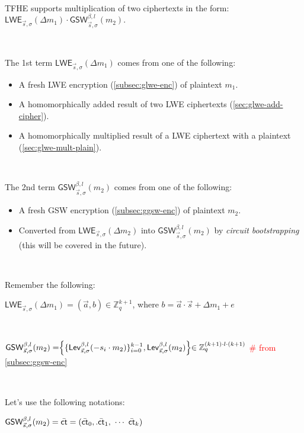 $ $

TFHE supports multiplication of two ciphertexts in the form: $\textsf{LWE}_{\vec{s}, \sigma}(\Delta m_1) \cdot \textsf{GSW}_{\vec{s}, \sigma}^{\beta, l}(m_2)$. 

$ $

\noindent The 1st term $\textsf{LWE}_{\vec{s}, \sigma}(\Delta m_1)$ comes from one of the following: 
\begin{itemize}
\item A fresh LWE encryption (\autoref{subsec:glwe-enc}) of plaintext $m_1$. 
\item A homomorphically added result of two LWE ciphertexts (\autoref{sec:glwe-add-cipher}). 
\item A homomorphically multiplied result of a LWE ciphertext with a plaintext (\autoref{sec:glwe-mult-plain}). 
\end{itemize}

$ $

\noindent The 2nd term $\textsf{GSW}_{\vec{s}, \sigma}^{\beta, l}(m_2)$ comes from one of the following:
\begin{itemize}
\item A fresh GSW encryption (\autoref{subsec:ggsw-enc}) of plaintext $m_2$.
\item Converted from $\textsf{LWE}_{\vec{s}, \sigma}(\Delta m_2)$ into $\textsf{GSW}_{\vec{s}, \sigma}^{\beta, l}(m_2)$ by \textit{circuit bootstrapping} (this will be covered in the future).
\end{itemize}

$ $

\noindent Remember the following: 

$\textsf{LWE}_{\vec{s}, \sigma}(\Delta m_1) = (\vec{a}, b) \in \mathbb{Z}_{q}^{k + 1}$, where $b = \vec{a} \cdot \vec{s} + \Delta m_1 + e$ 

$ $

$\textsf{GSW}_{\vec{s}, \sigma}^{\beta, l}(m_2) = \Bigr \{ \{ \textsf{Lev}_{\vec{s}, \sigma}^{\beta, l} (-s_i \cdot m_2)  \}_{i=0}^{k-1}, \textsf{Lev}_{\vec{s}, \sigma}^{\beta, l}(m_2) \Bigl \} \in \mathbb{Z}_{q }^{(k+1) \cdot l \cdot (k+1)}$ \textcolor{red}{\# from \autoref{subsec:ggsw-enc}}

$ $

\noindent Let's use the following notations:

$\textsf{GSW}_{\vec{s}, \sigma}^{\beta, l}(m_2) = {\bar{\textsf{ct}}} = (\bar{\textsf{ct}}_0,. \bar{\textsf{ct}}_1, \text{ } \text{$\cdots$} \text{ } \bar{\textsf{ct}}_k)$ 

